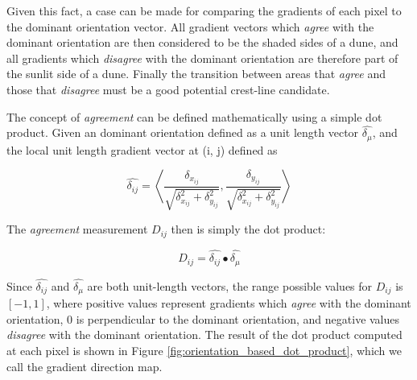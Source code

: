 Given this fact, a case can be made for comparing the gradients of each pixel to the dominant orientation vector. All gradient vectors which \emph{agree} with the dominant orientation are then considered to be the shaded sides of a dune, and all gradients which \emph{disagree} with the dominant orientation are therefore part of the sunlit side of a dune. Finally the transition between areas that \emph{agree} and those that \emph{disagree} must be a good potential crest-line candidate.

The concept of \emph{agreement} can be defined mathematically using a simple dot product. Given an dominant orientation defined as a unit length vector $\hat{\delta_{\mu}}$, and the local unit length gradient vector at (i, j) defined as

\begin{equation}
\hat{\delta_{ij}} = \left\langle \frac{\delta_{x_{ij}}}{\sqrt{\delta_{x_{ij}}^2 + \delta_{y_{ij}}^2}}, \frac{\delta_{y_{ij}}}{\sqrt{\delta_{x_{ij}}^2 + \delta_{y_{ij}}^2}}\right\rangle 
\end{equation}

The \emph{agreement} measurement $D_{ij}$ then is simply the dot product:

\begin{equation}
D_{ij} = \hat{\delta_{ij}} \bullet \hat{\delta_{\mu}}
\end{equation}

Since $\hat{\delta_{ij}}$ and $\hat{\delta_{\mu}}$ are both unit-length vectors, the range possible values for $D_{ij}$ is $[-1, 1]$, where positive values represent gradients which \emph{agree} with the dominant orientation, 0 is perpendicular to the dominant orientation, and negative values \emph{disagree} with the dominant orientation. The result of the dot product computed at each pixel is shown in Figure \ref{fig:orientation_based_dot_product}, which we call the gradient direction map.


